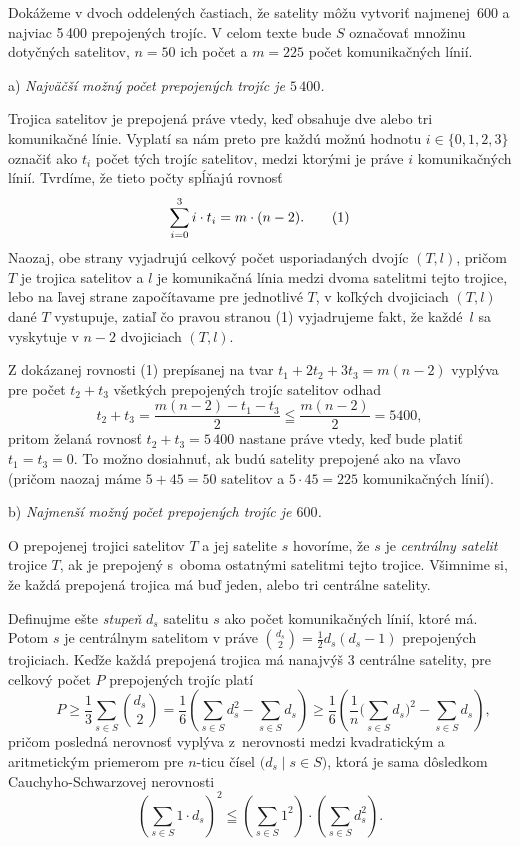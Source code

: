 {%
Dokážeme v dvoch oddelených častiach, že satelity môžu vytvoriť
najmenej~600 a najviac 5\,400 prepojených trojíc. V celom texte
bude $S$ označovať množinu dotyčných satelitov, $n=50$ ich počet a
$m=225$ počet komunikačných línií.

\medskip
a) \emph{Najväčší možný počet prepojených trojíc je $5\,400$.}

Trojica satelitov je prepojená práve vtedy, keď obsahuje dve
alebo tri komunikačné línie. Vyplatí sa nám preto pre každú možnú hodnotu $i\in\{0,1,2,3\}$
označiť ako $t_i$ počet tých trojíc satelitov, medzi ktorými je práve
$i$ komunikačných línií. Tvrdíme, že tieto počty spĺňajú rovnosť
$$
\sum_{i=0}^3 i\cdot t_i=m\cdot(n-2).
\tag1
$$
Naozaj, obe strany vyjadrujú celkový počet usporiadaných dvojíc
$(T,l)$, pričom $T$ je trojica satelitov a $l$ je komunikačná
línia medzi dvoma satelitmi tejto trojice, lebo na ľavej strane
započítavame pre jednotlivé $T$, v koľkých dvojiciach $(T,l)$ dané
$T$ vystupuje, zatiaľ čo pravou stranou (1) vyjadrujeme fakt, že každé~$l$
sa vyskytuje v $n-2$ dvojiciach $(T,l)$.

Z dokázanej rovnosti (1) prepísanej na tvar $t_1+2t_2+3t_3=m(n-2)$
vyplýva pre počet $t_2+t_3$ všetkých prepojených trojíc satelitov
odhad
$$
t_2+t_3 =\frac{m(n-2)-t_1-t_3}{2}\leqq \frac{m(n-2)}{2}=5400,
$$
pritom želaná rovnosť $t_2+t_3=5\,400$ nastane práve vtedy, keď bude
platiť $t_1=t_3=0$. To možno dosiahnuť, ak budú satelity
prepojené ako na \obr{} vľavo (pričom naozaj máme $5+45=50$ satelitov
a $5\cdot 45=225$ komunikačných línií).
%

\medskip
b) \emph{Najmenší možný počet prepojených trojíc je $600$.}

O prepojenej trojici satelitov $T$ a jej satelite $s$ hovoríme,
že $s$ je \emph{centrálny satelit} trojice $T$, ak
je prepojený s~oboma ostatnými satelitmi tejto trojice. Všimnime si,
že každá prepojená trojica má buď jeden, alebo tri centrálne satelity.

Definujme ešte \emph{stupeň} $d_s$ satelitu $s$ ako
počet komunikačných línií, ktoré má. Potom $s$ je centrálnym
satelitom v práve $\binom{d_s}2=\frac12d_s(d_s-1)$
prepojených trojiciach. Keďže každá prepojená trojica má
nanajvýš 3 centrálne satelity, pre celkový počet $P$ prepojených
trojíc platí
$$
\qquad P\ge \frac13 \sum_{s\in S}\binom{d_s}2
= \frac16 \left(\sum_{s\in S} d_s^2 - \sum_{s\in S} d_s\right)
\ge \frac16\left( \frac1n\bigg(\sum_{s\in S} d_s\bigg)^2 -
\sum_{s\in S} d_s\right),
$$
pričom posledná nerovnosť vyplýva z~nerovnosti medzi kvadratickým a
aritmetickým priemerom pre $n$-ticu čísel $\bigl(d_s\mid s\in
S\bigr)$, ktorá je sama dôsledkom Cauchyho-Schwarzovej
nerovnosti
$$
\left(\sum_{s\in S} 1\cdot d_s\right)^2\leqq
\left(\sum_{s\in S} 1^2\right)\cdot
\left(\sum_{s\in S} d_s^2\right).
$$

}

